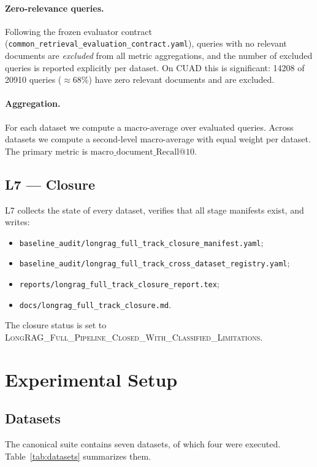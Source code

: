 \documentclass[11pt,a4paper]{article}
\begin{document}
\paragraph{Zero-relevance queries.}
Following the frozen evaluator contract
(\texttt{common\_retrieval\_evaluation\_contract.yaml}), queries
with no relevant documents are \emph{excluded} from all metric
aggregations, and the number of excluded queries is reported
explicitly per dataset. On CUAD this is significant:
\num{14208} of \num{20910} queries ($\approx 68\%$) have zero
relevant documents and are excluded.

\paragraph{Aggregation.}
For each dataset we compute a macro-average over evaluated queries.
Across datasets we compute a second-level macro-average with equal
weight per dataset. The primary metric is
$\mathrm{macro\_document\_Recall@10}$.

\subsection{L7 --- Closure}
L7 collects the state of every dataset, verifies that all stage
manifests exist, and writes:

\begin{itemize}[leftmargin=1.5em,itemsep=0.15em]
  \item \texttt{baseline\_audit/longrag\_full\_track\_closure\_manifest.yaml};
  \item \texttt{baseline\_audit/longrag\_full\_track\_cross\_dataset\_registry.yaml};
  \item \texttt{reports/longrag\_full\_track\_closure\_report.tex};
  \item \texttt{docs/longrag\_full\_track\_closure.md}.
\end{itemize}

The closure status is set to
\textsc{LongRAG\_Full\_Pipeline\_Closed\_With\_Classified\_Limitations}.

\section{Experimental Setup}\label{sec:experiments}

\subsection{Datasets}
The canonical suite contains seven datasets, of which four were
executed. Table~\ref{tab:datasets} summarizes them.
\end{document}
